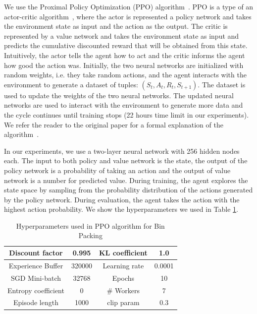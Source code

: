 \documentclass{article}
\begin{document}
We use the Proximal Policy Optimization (PPO) algorithm~\cite{schulman2017proximal}. PPO is a type of an actor-critic algorithm~\cite{konda2000actor}, where the actor is represented a policy network and takes the environment state as input and the action as the output. The critic is represented by a value network and takes the environment state as input and predicts the cumulative discounted reward that will be obtained from this state. Intuitively, the actor tells the agent how to act and the critic informs the agent how good the action was. 	Initially, the two neural networks are initialized with random weights, i.e. they take random actions, and the agent interacts with the environment to generate a dataset of tuples: $(S_t, A_t, R_t, S_{t+1})$. The dataset is used to update the weights of the two neural networks. The updated neural networks are used to interact with the environment to generate more data and the cycle continues until training stops (22 hours time limit in our experiments). We refer the reader to the original paper for a formal explanation of the algorithm~\cite{schulman2017proximal}.

In our experiments, we use a two-layer neural network with 256 hidden nodes each. The input to both policy and value network is the state, the output of the policy network is a probability of taking an action and the output of value network is a number for predicted value. During training, the agent explores the state space by sampling from the probability distribution of the actions generated by the policy network. During evaluation, the agent takes the action with the highest action probability. We show the hyperparameters we used in Table \ref{table:bin_packing_hyperparam}.

\begin{table}[h!]
	\centering
	\begin{tabular}{ |c|c|c|c| } 
		\hline
		Discount factor & 0.995 & KL coefficient & 1.0 \\ 
		\hline
		Experience Buffer & 320000 & Learning rate & 0.0001 \\
		\hline	
		SGD Mini-batch & 32768 & Epochs & 10 \\
		\hline
		Entropy coefficient & 0 & \# Workers & 7 \\
		\hline
		Episode length & 1000 & clip param & 0.3 \\
		\hline
	\end{tabular}
	\caption{Hyperparameters used in PPO algorithm for Bin Packing}
	\label{table:bin_packing_hyperparam}
\end{table}
\end{document}
